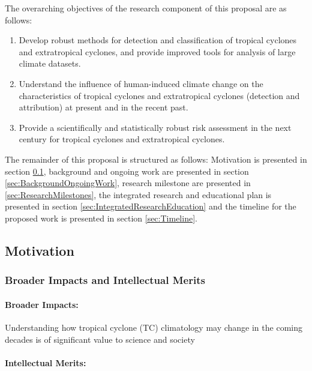 \documentclass[11pt]{article}
\begin{document}
The overarching objectives of the research component of this proposal are as follows:

\begin{enumerate}
\item Develop robust methods for detection and classification of tropical cyclones and extratropical cyclones, and provide improved tools for analysis of large climate datasets.

\item Understand the influence of human-induced climate change on the characteristics of tropical cyclones and extratropical cyclones (detection and attribution) at present and in the recent past.

\item Provide a scientifically and statistically robust risk assessment in the next century for tropical cyclones and extratropical cyclones.
\end{enumerate}

The remainder of this proposal is structured as follows: Motivation is presented in section \ref{sec:Motivation}, background and ongoing work are presented in section \ref{sec:BackgroundOngoingWork}, research milestone are presented in \ref{sec:ResearchMilestones}, the integrated research and educational plan is presented in section \ref{sec:IntegratedResearchEducation} and the timeline for the proposed work is presented in section \ref{sec:Timeline}.

\subsection{Motivation} \label{sec:Motivation}

\subsubsection{Broader Impacts and Intellectual Merits}

\paragraph{Broader Impacts:}  
Understanding how tropical cyclone (TC) climatology may change in the coming decades is of significant value to science and society

\paragraph{Intellectual Merits:}  
\end{document}
